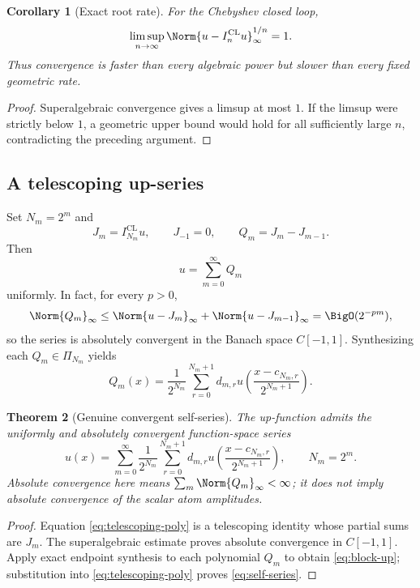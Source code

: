 \documentclass[11pt,oneside]{article}
\newtheorem{theorem}{Theorem}[section]
\newtheorem{corollary}[theorem]{Corollary}
\theoremstyle{definition}
\theoremstyle{remark}
\newcommand{\1}{\mathbf{1}}
\begin{document}
\begin{corollary}[Exact root rate]
\label{cor:root-rate}
For the Chebyshev closed loop,
\begin{equation}
 \limsup_{n\to\infty}
 \Norm{u-I_n^{\mathrm{CL}}u}_\infty^{1/n}=1.
 \label{eq:root-rate}
\end{equation}
Thus convergence is faster than every algebraic power but slower than every
fixed geometric rate.
\end{corollary}

\begin{proof}
Superalgebraic convergence gives a limsup at most $1$.  If the limsup were
strictly below $1$, a geometric upper bound would hold for all sufficiently
large $n$, contradicting the preceding argument.
\end{proof}

\subsection{A telescoping up-series}

Set $N_m=2^m$ and
\[
 J_m=I_{N_m}^{\mathrm{CL}}u,
 \qquad J_{-1}=0,
 \qquad Q_m=J_m-J_{m-1}.
\]
Then
\begin{equation}
 u=\sum_{m=0}^{\infty}Q_m
 \label{eq:telescoping-poly}
\end{equation}
uniformly.  In fact, for every $p>0$,
\[
 \Norm{Q_m}_\infty
 \le\Norm{u-J_m}_\infty+\Norm{u-J_{m-1}}_\infty
 =\BigO(2^{-pm}),
\]
so the series is absolutely convergent in the Banach space $C[-1,1]$.
Synthesizing each $Q_m\in\Pi_{N_m}$ yields
\begin{equation}
 Q_m(x)=\frac1{2^{N_m}}
 \sum_{r=0}^{N_m+1}d_{m,r}
 u\!\left(\frac{x-c_{N_m,r}}{2^{N_m+1}}\right).
 \label{eq:block-up}
\end{equation}

\begin{theorem}[Genuine convergent self-series]
\label{thm:self-series}
The up-function admits the uniformly and absolutely convergent function-space
series
\begin{equation}
 \boxed{
 u(x)=\sum_{m=0}^{\infty}\frac1{2^{N_m}}
 \sum_{r=0}^{N_m+1}d_{m,r}
 u\!\left(\frac{x-c_{N_m,r}}{2^{N_m+1}}\right),
 \qquad N_m=2^m.}
 \label{eq:self-series}
\end{equation}
Absolute convergence here means
$\sum_m\Norm{Q_m}_\infty<\infty$; it does not imply absolute convergence of
the scalar atom amplitudes.
\end{theorem}

\begin{proof}
Equation \eqref{eq:telescoping-poly} is a telescoping identity whose partial
sums are $J_m$.  The superalgebraic estimate proves absolute convergence in
$C[-1,1]$.  Apply exact endpoint synthesis to each polynomial $Q_m$ to obtain
\eqref{eq:block-up}; substitution into \eqref{eq:telescoping-poly} proves
\eqref{eq:self-series}.
\end{proof}
\end{document}
